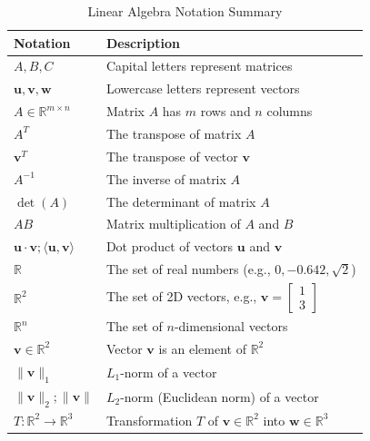 \documentclass[11pt, a4paper]{article}
\date{\today}
\begin{document}
\begin{table}[h]
\centering
\renewcommand{\arraystretch}{1.5} %
\begin{tabular}{|l|l|}
\hline
\textbf{Notation} & \textbf{Description} \\ \hline
$A, B, C$ & Capital letters represent matrices \\ \hline
$\mathbf{u}, \mathbf{v}, \mathbf{w}$ & Lowercase letters represent vectors \\ \hline
$A \in \mathbb{R}^{m \times n}$ & Matrix $A$ has $m$ rows and $n$ columns \\ \hline
$A^T$ & The transpose of matrix $A$ \\ \hline
$\mathbf{v}^T$ & The transpose of vector $\mathbf{v}$ \\ \hline
$A^{-1}$ & The inverse of matrix $A$ \\ \hline
$\det(A)$ & The determinant of matrix $A$ \\ \hline
$AB$ & Matrix multiplication of $A$ and $B$ \\ \hline
$\mathbf{u} \cdot \mathbf{v}; \langle \mathbf{u}, \mathbf{v} \rangle$ & Dot product of vectors $\mathbf{u}$ and $\mathbf{v}$ \\ \hline
$\mathbb{R}$ & The set of real numbers (e.g., $0, -0.642, \sqrt{2}$) \\ \hline
$\mathbb{R}^2$ & The set of 2D vectors, e.g., $\mathbf{v} = \begin{bmatrix} 1 \\ 3 \end{bmatrix}$ \\ \hline
$\mathbb{R}^n$ & The set of $n$-dimensional vectors \\ \hline
$\mathbf{v} \in \mathbb{R}^2$ & Vector $\mathbf{v}$ is an element of $\mathbb{R}^2$ \\ \hline
$\|\mathbf{v}\|_1$ & $L_1$-norm of a vector \\ \hline
$\|\mathbf{v}\|_2; \|\mathbf{v}\|$ & $L_2$-norm (Euclidean norm) of a vector \\ \hline
$T: \mathbb{R}^2 \to \mathbb{R}^3$ & Transformation $T$ of $\mathbf{v} \in \mathbb{R}^2$ into $\mathbf{w} \in \mathbb{R}^3$ \\ \hline
\end{tabular}
\caption{Linear Algebra Notation Summary}
\end{table}
\end{document}

